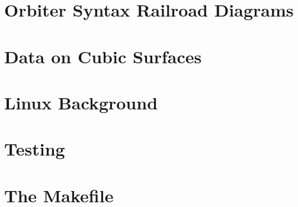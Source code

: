 \documentclass[10pt]{book}
\begin{document}
\chapter{Orbiter Syntax Railroad Diagrams}
\label{chapter:rr}




\chapter{Data on Cubic Surfaces}
\label{chapter:data:cubic:surfaces}




\chapter{Linux Background}
\label{chapter:unix:linux}





%


\chapter{Testing}
\label{chapter:testing}



\chapter{The Makefile}
\label{chapter:makefile}





%




%








\end{document}
